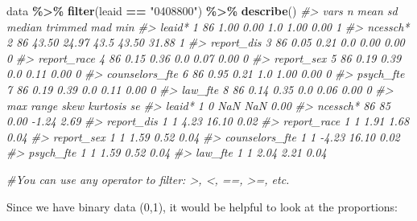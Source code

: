 \documentclass[
]{book}
\newenvironment{Shaded}{\begin{snugshade}}{\end{snugshade}}
\newcommand{\CommentTok}[1]{\textcolor[rgb]{0.56,0.35,0.01}{\textit{#1}}}
\newcommand{\FunctionTok}[1]{\textcolor[rgb]{0.13,0.29,0.53}{\textbf{#1}}}
\newcommand{\NormalTok}[1]{#1}
\newcommand{\SpecialCharTok}[1]{\textcolor[rgb]{0.81,0.36,0.00}{\textbf{#1}}}
\newcommand{\StringTok}[1]{\textcolor[rgb]{0.31,0.60,0.02}{#1}}
\begin{document}
\begin{Shaded}
\begin{Highlighting}[]
\NormalTok{data }\SpecialCharTok{\%\textgreater{}\%} 
  \FunctionTok{filter}\NormalTok{(leaid }\SpecialCharTok{==} \StringTok{"0408800"}\NormalTok{) }\SpecialCharTok{\%\textgreater{}\%} 
  \FunctionTok{describe}\NormalTok{() }
\CommentTok{\#\textgreater{}                vars  n  mean    sd median trimmed   mad min}
\CommentTok{\#\textgreater{} leaid*            1 86  1.00  0.00    1.0    1.00  0.00   1}
\CommentTok{\#\textgreater{} ncessch*          2 86 43.50 24.97   43.5   43.50 31.88   1}
\CommentTok{\#\textgreater{} report\_dis        3 86  0.05  0.21    0.0    0.00  0.00   0}
\CommentTok{\#\textgreater{} report\_race       4 86  0.15  0.36    0.0    0.07  0.00   0}
\CommentTok{\#\textgreater{} report\_sex        5 86  0.19  0.39    0.0    0.11  0.00   0}
\CommentTok{\#\textgreater{} counselors\_fte    6 86  0.95  0.21    1.0    1.00  0.00   0}
\CommentTok{\#\textgreater{} psych\_fte         7 86  0.19  0.39    0.0    0.11  0.00   0}
\CommentTok{\#\textgreater{} law\_fte           8 86  0.14  0.35    0.0    0.06  0.00   0}
\CommentTok{\#\textgreater{}                max range  skew kurtosis   se}
\CommentTok{\#\textgreater{} leaid*           1     0   NaN      NaN 0.00}
\CommentTok{\#\textgreater{} ncessch*        86    85  0.00    {-}1.24 2.69}
\CommentTok{\#\textgreater{} report\_dis       1     1  4.23    16.10 0.02}
\CommentTok{\#\textgreater{} report\_race      1     1  1.91     1.68 0.04}
\CommentTok{\#\textgreater{} report\_sex       1     1  1.59     0.52 0.04}
\CommentTok{\#\textgreater{} counselors\_fte   1     1 {-}4.23    16.10 0.02}
\CommentTok{\#\textgreater{} psych\_fte        1     1  1.59     0.52 0.04}
\CommentTok{\#\textgreater{} law\_fte          1     1  2.04     2.21 0.04}


\CommentTok{\#You can use any operator to filter: \textgreater{}, \textless{}, ==, \textgreater{}=, etc.}
\end{Highlighting}
\end{Shaded}

Since we have binary data (0,1), it would be helpful to look at the proportions:
\end{document}
